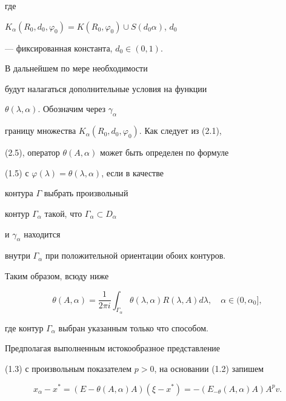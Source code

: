 где 


$K_\alpha(R_0,d_0,\varphi_0)=K(R_0,\varphi_0)\cup S(d_0\alpha)$, $d_0$ 


--- фиксированная константа, $d_0\in(0,1)$. 


\medskip 


 


В дальнейшем по мере необходимости 


будут налагаться дополнительные условия на функции 


$\theta(\lambda,\alpha)$. Обозначим через $\gamma_\alpha$ 


границу множества $K_\alpha(R_0,d_0,\varphi_0)$. Как следует из (2.1), 


(2.5), оператор $\theta(A,\alpha)$ может быть определен по формуле 


(1.5) с $\varphi(\lambda)=\theta(\lambda,\alpha)$, если в качестве 


контура $\Gamma$ выбрать произвольный


контур $\Gamma_\alpha$ такой, что $\Gamma_\alpha\subset D_\alpha$ 


и $\gamma_\alpha$ находится 


внутри $\Gamma_\alpha$ при положительной ориентации обоих контуров. 


Таким образом, всюду ниже 


\begin{equation} 


\theta(A,\alpha)=\frac{1}{2\pi i}\int_{\Gamma_\alpha} 


\theta(\lambda,\alpha)R(\lambda,A)d\lambda,\quad 


\alpha\in(0,\alpha_0], 


\end{equation} 


где контур $\Gamma_\alpha$ выбран указанным только что способом. 


 


Предполагая выполненным истокообразное представление 


(1.3) с произвольным показателем $p>0$, на основании (1.2) запишем 


\begin{equation} 


x_\alpha-x^*=(E-\theta(A,\alpha)A)(\xi-x^*)= 


-(E_{-\theta}(A,\alpha)A)A^p v. 


\end{equation} 


